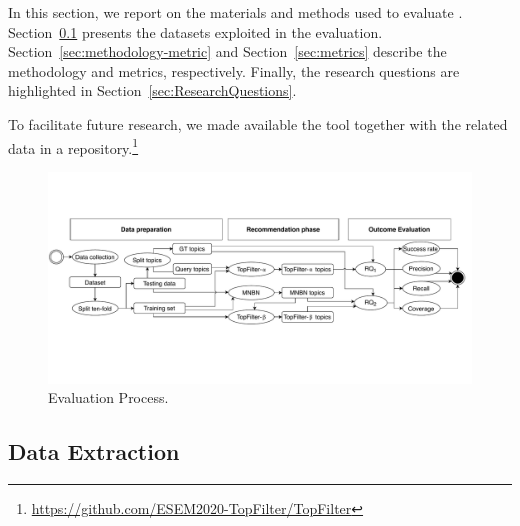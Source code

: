 





In this section, we report on the materials and methods used to evaluate \TF. %
Section~\ref{sec:Dataset} presents the datasets exploited in the evaluation. Section~\ref{sec:methodology-metric} and Section~\ref{sec:metrics} describe the methodology and metrics, respectively. Finally, the research questions are highlighted in Section~\ref{sec:ResearchQuestions}.

To facilitate future research, we made available the \TF tool together with the related data in a \GH repository.\footnote{\url{https://github.com/ESEM2020-TopFilter/TopFilter}}


\begin{figure}[h!]
	\centering
	\includegraphics[width=0.9\linewidth,keepaspectratio]{figs/evaluationCF.pdf}
	\caption{Evaluation Process.}
	\label{fig:EvaluationProcess}
	\vspace{-.3cm}
\end{figure}

\subsection{Data Extraction} \label{sec:Dataset}




